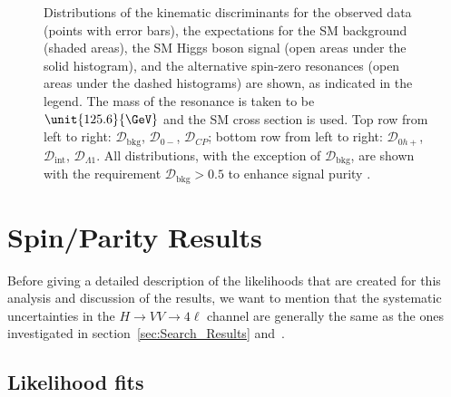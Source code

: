 \begin{figure}
\caption[Distributions of the kinematic discriminants for
the observed data (points with error bars), the expectations for the SM background (shaded areas),
the SM Higgs boson signal (open areas under the solid histogram),
and the alternative spin-zero resonances (open areas under the dashed histograms) are shown,
as indicated in the legend.
The mass of the resonance is taken to be $\unit{125.6}{\GeV}$ and the SM cross section is used.
Top row from left to right:
$\mathcal{D}_\text{bkg}$,
$\mathcal{D}_{0-}$,
$\mathcal{D}_{C\!P}$;
bottom row from left to right:
$\mathcal{D}_{0h+}$,
$\mathcal{D}_\text{int}$,
$\mathcal{D}_{\Lambda1}$.
All distributions, with the exception of $\mathcal{D}_\text{bkg}$, are shown
with the requirement $\mathcal{D}_\text{bkg}>0.5$ to enhance signal purity.]{
Distributions of the kinematic discriminants for
the observed data (points with error bars), the expectations for the SM background (shaded areas),
the SM Higgs boson signal (open areas under the solid histogram),
and the alternative spin-zero resonances (open areas under the dashed histograms) are shown,
as indicated in the legend.
The mass of the resonance is taken to be $\unit{125.6}{\GeV}$ and the SM cross section is used.
Top row from left to right:
$\mathcal{D}_\text{bkg}$,
$\mathcal{D}_{0-}$,
$\mathcal{D}_{C\!P}$;
bottom row from left to right:
$\mathcal{D}_{0h+}$,
$\mathcal{D}_\text{int}$,
$\mathcal{D}_{\Lambda1}$.
All distributions, with the exception of $\mathcal{D}_\text{bkg}$, are shown
with the requirement $\mathcal{D}_\text{bkg}>0.5$ to enhance signal purity \cite{Khachatryan:2014kca}.
}
\label{fig:discriminants}

\end{figure}


\section{Spin/Parity Results}
\label{sec:SpinParity_Results}

Before giving a detailed description of the likelihoods that are created for this analysis and discussion of the results, we want to mention that the systematic uncertainties in the $H \to VV \to 4\ell$ channel are generally the same as the ones investigated in section~\ref{sec:Search_Results} and~\cite{Chatrchyan:2013mxa}.

\subsection{Likelihood fits} 
\label{sec:MLfit}

